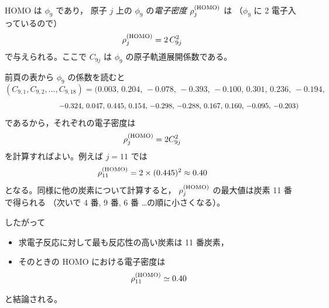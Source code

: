 \documentclass[a4paper,12pt]{jlreq}
\begin{document}
HOMO は $\phi_9$ であり，
原子 $j$ 上の $\phi_9$ の\emph{電子密度} $\rho_j^{\rm(HOMO)}$ は
（$\phi_9$ に 2 電子入っているので）
\[
\rho_j^{\rm(HOMO)} = 2\,C_{9j}^2
\]
で与えられる。ここで $C_{9j}$ は $\phi_9$ の原子軌道展開係数である。

前頁の表から $\phi_9$ の係数を読むと
\[
(C_{9,1},C_{9,2},\dots,C_{9,18}) =
(0.003,\,0.204,\,-0.078,\,-0.393,\,-0.100,\,0.301,\,0.236,\,-0.194,
\]
\[
\hspace{7.3em}
-0.324,\,0.047,\,0.445,\,0.154,\,-0.298,\,-0.288,\,0.167,\,0.160,\,-0.095,\,-0.203)
\]
であるから，それぞれの電子密度は
\[
\rho_j^{\rm(HOMO)} = 2C_{9j}^2
\]
を計算すればよい。例えば $j=11$ では
\[
\rho_{11}^{\rm(HOMO)}
=2\times(0.445)^2
\approx 0.40
\]
となる。同様に他の炭素について計算すると，
$\rho_j^{\rm(HOMO)}$ の最大値は炭素 11 番で得られる
（次いで 4 番, 9 番, 6 番 \dots の順に小さくなる）。

したがって
\begin{itemize}
  \item 求電子反応に対して最も反応性の高い炭素は 11 番炭素，
  \item そのときの HOMO における電子密度は
        \[
        \rho_{11}^{\rm(HOMO)} \simeq 0.40
        \]
\end{itemize}
と結論される。
\end{document}
